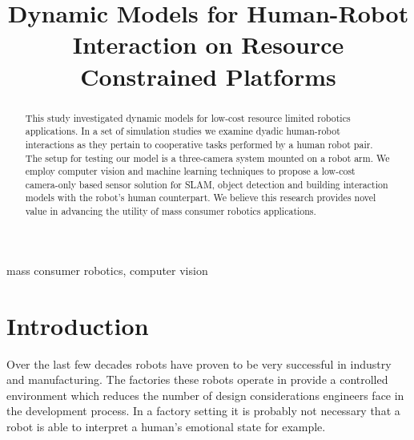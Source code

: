 \documentclass[conference]{IEEEtran}
\begin{document}
\title{Dynamic Models for Human-Robot Interaction on Resource Constrained Platforms\\
}

\author{
\and
{}
}

\maketitle

\begin{abstract}
This study investigated dynamic models for low-cost resource limited robotics applications. In a set of simulation studies we examine dyadic human-robot interactions as they pertain to cooperative tasks performed by a human robot pair. The setup for testing our model is a three-camera system mounted on a robot arm. We employ computer vision and machine learning techniques to propose a low-cost camera-only based sensor solution for SLAM, object detection and building interaction models with the robot's human counterpart. We believe this research provides novel value in advancing the utility of mass consumer robotics applications.
\end{abstract}

\begin{IEEEkeywords}
mass consumer robotics, computer vision
\end{IEEEkeywords}

\section{Introduction}
Over the last few decades robots have proven to be very successful in industry and manufacturing\cite{b1}. The factories these robots operate in provide a controlled environment which reduces the number of design considerations engineers face in the development process. In a factory setting it is probably not necessary that a robot is able to interpret a human's emotional state for example.
\end{document}
